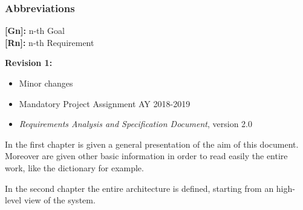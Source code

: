 {{\color{Blue}\subsubsection{Abbreviations}}
\textbf{[Gn]:} n-th Goal\\
\textbf{[Rn]:} n-th Requirement


{}
\textbf{Revision 1:}\begin{itemize}
	\item Minor changes
\end{itemize}

{}
\begin{itemize}
	\item Mandatory Project Assignment AY 2018-2019
	\item\textit{Requirements Analysis and Specification Document}, version 2.0
\end{itemize}

{}

{}
In the first chapter is given a general presentation of the aim of this document. Moreover are given other basic information in order to read easily the entire work, like the dictionary for example.

{}
In the second chapter the entire architecture is defined, starting from an high-level view of the system.



}
